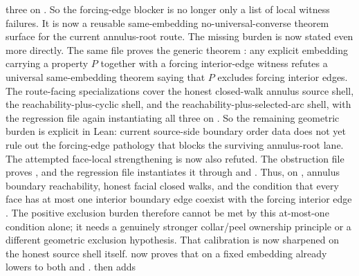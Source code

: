\documentclass[11pt]{article}
\begin{document}
three on .  So the forcing-edge blocker is no
longer only a list of local witness failures.  It is now a reusable
same-embedding no-universal-converse theorem surface for the current
annulus-root route.
The missing burden is now stated even more directly.  The same file proves the
generic theorem
:
any explicit embedding carrying a property $P$ together with a forcing
interior-edge witness refutes a universal same-embedding theorem saying that
$P$ excludes forcing interior edges.  The route-facing specializations cover
the honest closed-walk annulus source shell, the reachability-plus-cyclic
shell, and the reachability-plus-selected-arc shell, with the regression file
again instantiating all three on .  So the
remaining geometric burden is explicit in Lean: current source-side boundary
order data does not yet rule out the forcing-edge pathology that blocks the
surviving annulus-root lane.
The attempted face-local strengthening is now also refuted.  The obstruction
file proves
,
and the regression file instantiates it through
and
.
Thus, on , annulus boundary reachability,
honest facial closed walks, and the condition that every face has at most one
interior boundary edge coexist with the forcing interior edge .  The
positive exclusion burden therefore cannot be met by this at-most-one
condition alone; it needs a genuinely stronger collar/peel ownership
principle or a different geometric exclusion hypothesis.
That calibration is now sharpened on the honest source shell itself.
 now proves that on a fixed embedding
 already
lowers to both 
and .
 then adds
\end{document}
